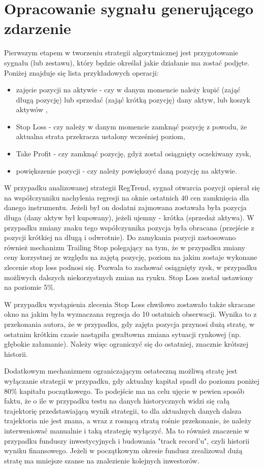 \documentclass[man,mfu]{mgrwms}
\begin{document}
\section{Opracowanie sygnału generującego zdarzenie}

Pierwszym etapem w tworzeniu strategii algorytmicznej jest przygotowanie sygnału (lub zestawu), który będzie określał jakie działanie ma zostać podjęte. Poniżej znajduje się lista przykładowych operacji:

\begin{itemize}
\item zajęcie pozycji na aktywie - czy w danym momencie należy kupić (zająć długą pozycję) lub sprzedać (zająć krótką pozycję) dany aktyw, lub koszyk aktywów ,
\item Stop Loss - czy należy w danym momencie zamknąć pozycję z powodu, że aktualna strata przekracza ustalony wcześniej poziom,
\item Take Profit - czy zamknąć pozycję, gdyż został osiągnięty oczekiwany zysk,
\item powiększenie pozycji - czy należy powiększyć daną pozycję na aktywie.
\end{itemize}

W przypadku analizowanej strategii RegTrend, sygnał otwarcia pozycji opierał się na współczynniku nachylenia regresji na oknie ostatnich $40$ cen zamknięcia dla danego instrumentu. Jeżeli był on dodatni zajmowana zostawała była pozycja długa (dany aktyw był kupowany), jeżeli ujemny - krótka (sprzedaż aktywa). W przypadku zmiany znaku tego współczynnika pozycja była obracana (przejście z pozycji krótkiej na długą i odwrotnie). Do zamykania pozycji zastosowano również mechanizm Trailing Stop polegający na tym, że w przypadku zmiany ceny korzystnej ze względu na zajętą pozycję, poziom na jakim zostaje wykonane zlecenie stop loss podnosi się. Pozwala to zachować osiągnięty zysk, w przypadku możliwych dalszych niekorzystnych zmian na rynku. Stop Loss został ustawiony na poziomie 5\%. 

W przypadku wystąpienia zlecenia Stop Loss chwilowo zostawało także skracane okno na jakim była wyznaczana regresja do 10 ostatnich obserwacji. Wynika to z przekonania autora, że w przypadku, gdy zajęta pozycja przynosi dużą stratę, w ostatnim krótkim czasie nastąpiła gwałtowna zmiana sytuacji rynkowej (np. głębokie załamanie). Należy więc ograniczyć się do ostatniej, znacznie krótszej historii.

Dodatkowym mechanizmem ograniczającym ostateczną możliwą stratę jest wyłączanie strategii w przypadku, gdy aktualny  kapitał spadł do poziomu poniżej 80\% kapitału początkowego. To podejście ma na celu ujęcie w pewien sposób faktu, że o ile w przypadku testu na danych historycznych widzi się całą trajektorię przedstawiającą wynik strategii, to dla aktualnych danych dalsza trajektoria nie jest znana, a wraz z rosnącą stratą rośnie przekonanie, że należy interweniować manualnie i taką strategię wyłączyć. Ma to również znaczenie w przypadku funduszy inwestycyjnych i budowania "track record'u", czyli historii wyniku finansowego. Jeżeli w początkowym okresie fundusz zrealizował dużą stratę ma mniejsze szanse na znalezienie kolejnych inwestorów.
\end{document}
